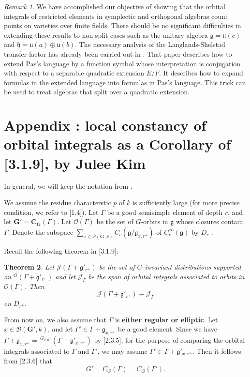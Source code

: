\documentclass[11pt]{amsart}
\newtheorem{theorem}{Theorem}[section]
\theoremstyle{definition}
\theoremstyle{remark}
\newtheorem{remark}[theorem]{Remark}
\numberwithin{equation}{theorem}
\def\lie#1{{\mathfrak{#1}}}
\begin{document}
\begin{remark}\label{remark:unitary}
We have accomplished our objective of showing that the orbital
integrals of restricted elements in symplectic and orthogonal
algebras count points on varieties over finite fields. There
should be no significant difficulties in extending these results
to non-split cases such as the unitary algebra
$\lie{g}=\lie{u}(c)$ and $\lie{h}=\lie{u}(a)\oplus\lie{u}(b)$. The
necessary analysis of the Langlands-Shelstad transfer factor has
already been carried out in \cite{VTF}.  That paper describes how
to extend Pas's language by a function symbol whose interpretation
is conjugation with respect to a separable quadratic extension
$E/F$. It describes how to expand formulas in the extended
language into formulas in Pas's language.  This trick can be used
to treat algebras that split over a quadratic extension.
\end{remark}


\section{Appendix : local constancy of orbital integrals as a
Corollary of \cite{KM}[3.1.9], by Julee Kim}

In general, we will keep the notation from \cite{KM}.

We assume the residue characterstic $p$ of $k$ is sufficiently
large (for more precise condition, we refer to \cite{KM}[1.4]).
Let $\Gamma$ be a good semisimple element of depth $r$, and let
$\mathbf G'=\mathbf C_{\mathbf G}(\Gamma)$. Let $\mathcal
O(\Gamma)$ be the set of $G$-orbits in $\mathfrak g$ whose
closures contain $\Gamma$. Denote the subspace $\sum_{x\in\mathcal
B(\mathbf G,k)} C_c(\mathfrak g/\mathfrak g_{x,r^+})$ of
$C_c^\infty(\mathfrak g)$ by $D_{r^+}$.

Recall the following theorem in \cite{KM}[3.1.9]:

\begin{theorem}
Let $\mathcal J(\Gamma+\mathfrak g'_{r^+})$ be the set of
$G$-invariant distributions supported on $^G(\Gamma+\mathfrak
g'_{r^+})$ and let $\mathcal J_\Gamma$ be the span of orbital
integrals associated to orbits in $\mathcal O(\Gamma)$. Then
\[
\mathcal J(\Gamma+\mathfrak g'_{r^+})\equiv\mathcal J_\Gamma
\]
on $D_{r^+}$.
\end{theorem}

From now on, we also assume that $\Gamma$ is {\bf either regular
or elliptic}. Let $x\in\mathcal B(\mathbf G',k)$, and let
$\Gamma'\in\Gamma+\mathfrak g_{x,r^+}$ be a good element. Since we
have $\Gamma+\mathfrak g_{x,r^+}=\,^{G_{x,0^+}}(\Gamma+\mathfrak
g'_{x,r^+})$ by \cite{KM}[2.3.5], for the purpose of comparing the
orbital integrals associated to $\Gamma$ and $\Gamma'$, we may
assume $\Gamma'\in\Gamma+\mathfrak g'_{x,r^+}$. Then it follows
from \cite{KM}[2.3.6] that
\[
G'=C_G(\Gamma)=C_G(\Gamma').
\]
\end{document}

